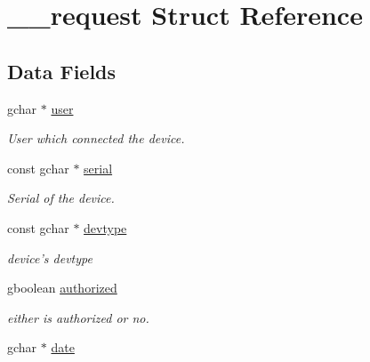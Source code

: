 \hypertarget{struct____request}{
\section{\_\-\_\-request Struct Reference}
\label{struct____request}
}
\subsection*{Data Fields}
\begin{DoxyCompactItemize}
\item 
\hypertarget{struct____request_a868bb28f4a437297fbfc4ffdde7d1994}{
gchar $\ast$ \hyperlink{struct____request_a868bb28f4a437297fbfc4ffdde7d1994}{user}}
\label{struct____request_a868bb28f4a437297fbfc4ffdde7d1994}

\begin{DoxyCompactList}\small\item\em User which connected the device. \item\end{DoxyCompactList}\item 
\hypertarget{struct____request_a4db7bd27aecc13de323bc563476d15d9}{
const gchar $\ast$ \hyperlink{struct____request_a4db7bd27aecc13de323bc563476d15d9}{serial}}
\label{struct____request_a4db7bd27aecc13de323bc563476d15d9}

\begin{DoxyCompactList}\small\item\em Serial of the device. \item\end{DoxyCompactList}\item 
\hypertarget{struct____request_a719ae25eb4aa4db3fc684802d8f4cd32}{
const gchar $\ast$ \hyperlink{struct____request_a719ae25eb4aa4db3fc684802d8f4cd32}{devtype}}
\label{struct____request_a719ae25eb4aa4db3fc684802d8f4cd32}

\begin{DoxyCompactList}\small\item\em device's devtype \item\end{DoxyCompactList}\item 
\hypertarget{struct____request_a50b65fbfcbd14f8a04d21f9b24673663}{
gboolean \hyperlink{struct____request_a50b65fbfcbd14f8a04d21f9b24673663}{authorized}}
\label{struct____request_a50b65fbfcbd14f8a04d21f9b24673663}

\begin{DoxyCompactList}\small\item\em either is authorized or no. \item\end{DoxyCompactList}\item 
\hypertarget{struct____request_a936dafcdc086dbb0d5e6f99b89c8731c}{
gchar $\ast$ \hyperlink{struct____request_a936dafcdc086dbb0d5e6f99b89c8731c}{date}}
\label{struct____request_a936dafcdc086dbb0d5e6f99b89c8731c}


\end{DoxyCompactItemize}
